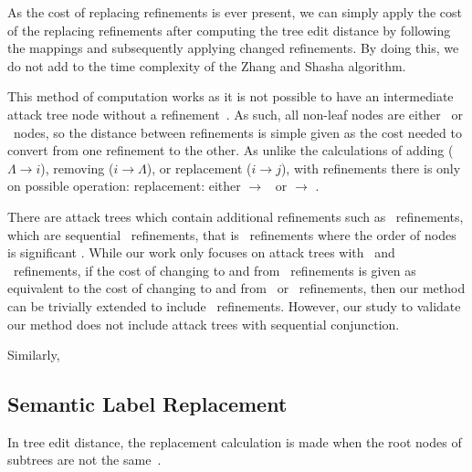 As the cost of replacing refinements is ever present, we can simply apply the cost of the replacing refinements after computing the tree edit distance by following the mappings and subsequently applying changed refinements. By doing this, we do not add to the time complexity of the Zhang and Shasha algorithm.

This method of computation works as it is not possible to have an intermediate attack tree node without a refinement~\cite{mauw_foundations_2006}. As such, all non-leaf nodes are either \AND\ or \OR\ nodes, so the distance between refinements is simple given as the cost needed to convert from one refinement to the other. As unlike the calculations of adding ($\Lambda \rightarrow i$), removing ($i \rightarrow \Lambda$), or replacement ($i \rightarrow j$), with refinements there is only on possible operation: replacement: either \AND $\rightarrow$ \OR\ or \OR $\rightarrow$ \AND.

There are attack trees which contain additional refinements such as \SAND\ refinements, which are sequential \AND\ refinements, that is \AND\ refinements where the order of nodes is significant \cite{jhawar_attack_2015}. While our work only focuses on attack trees with \AND\ and \OR\ refinements, if the cost of changing to and from \SAND\ refinements is given as equivalent to the cost of changing to and from \AND\ or \OR\ refinements, then our method can be trivially extended to include \SAND\ refinements. However, our study to validate our method does not include attack trees with sequential conjunction.

Similarly, 


\subsection{Semantic Label Replacement}

In tree edit distance, the replacement calculation is made when the root nodes of subtrees are not the same~\cite{zhang_simple_1989}.


